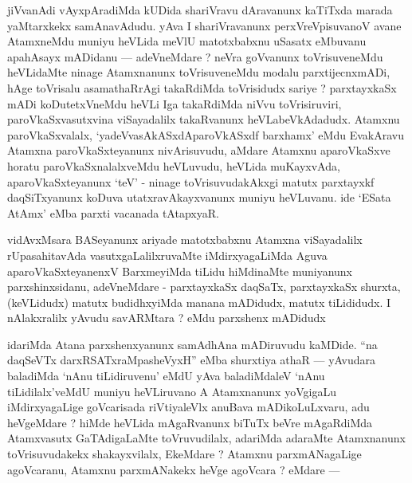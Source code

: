 \begin{artha}
jiVvanAdi vAyxpAradiMda kUDida shariVravu dAravanunx kaTiTxda marada yaMtarxkekx samAnavAdudu. yAva I shariVravanunx perxVreVpisuvanoV avane AtamxneMdu muniyu heVLida meVlU matotxbabxnu uSasatx eMbuvanu apahAsayx mADidanu --- adeVneMdare ? neVra goVvanunx toVrisuveneMdu heVLidaMte ninage Atamxnanunx toVrisuveneMdu modalu parxtijecnxmADi, hAge toVrisalu asamathaRrAgi takaRdiMda toVrisidudx sariye ? parxtayxkaSx mADi koDutetxVneMdu heVLi Iga takaRdiMda niVvu toVrisiruviri, paroVkaSxvasutxvina viSayadalilx takaRvanunx heVLabeVkAdadudx. Atamxnu paroVkaSxvalalx, `yadeVvasAkASxdAparoVkASxdf barxhamx' eMdu EvakAravu Atamxna paroVkaSxteyanunx nivArisuvudu, aMdare Atamxnu aparoVkaSxve horatu paroVkaSxnalalxveMdu heVLuvudu, heVLida muKayxvAda, aparoVkaSxteyanunx `teV' - ninage toVrisuvudakAkxgi matutx parxtayxkf daqSiTxyanunx koDuva utatxravAkayxvanunx muniyu heVLuvanu. ide `ESata AtAmx' eMba parxti vacanada tAtapxyaR.
\end{artha}


\begin{artha}
vidAvxMsara BASeyanunx ariyade matotxbabxnu Atamxna viSayadalilx rUpasahitavAda vasutxgaLalilxruvaMte iMdirxyagaLiMda Aguva aparoVkaSxteyanenxV BarxmeyiMda tiLidu hiMdinaMte muniyanunx parxshinxsidanu, adeVneMdare - parxtayxkaSx daqSaTx, parxtayxkaSx shurxta, (keVLidudx) matutx budidhxyiMda manana mADidudx, matutx tiLididudx. I nAlakxralilx yAvudu savARMtara ? eMdu parxshenx mADidudx 
\end{artha}


\begin{artha}
idariMda Atana parxshenxyanunx samAdhAna mADiruvudu kaMDide. ``na daqSeVTx darxRSATxraMpasheVyxH'' eMba shurxtiya athaR --- yAvudara baladiMda `nAnu tiLidiruvenu' eMdU yAva baladiMdaleV `nAnu tiLidilalx'veMdU muniyu heVLiruvano A Atamxnanunx yoVgigaLu iMdirxyagaLige goVcarisada riVtiyaleVlx anuBava mADikoLuLxvaru, adu heVgeMdare ? hiMde heVLida mAgaRvanunx biTuTx beVre mAgaRdiMda Atamxvasutx GaTAdigaLaMte toVruvudilalx, adariMda adaraMte Atamxnanunx toVrisuvudakekx shakayxvilalx, EkeMdare ? Atamxnu parxmANagaLige agoVcaranu, Atamxnu parxmANakekx heVge agoVcara ? eMdare --- 
\end{artha}


